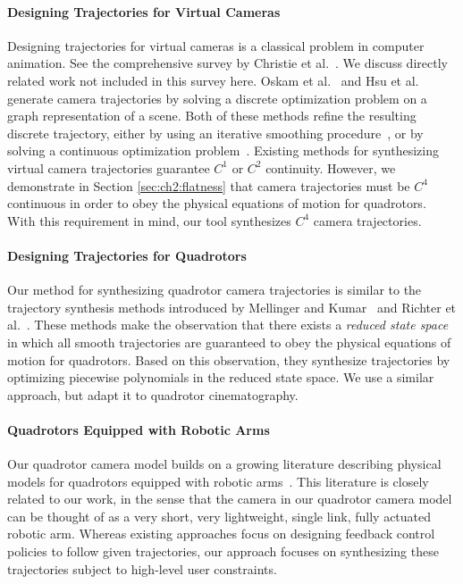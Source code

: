 \paragraph{Designing Trajectories for Virtual Cameras}
Designing trajectories for virtual cameras is a classical problem in computer animation.
See the comprehensive survey by Christie et al.~.
We discuss directly related work not included in this survey here.
Oskam et al.~ and Hsu et al.~ generate camera trajectories by solving a discrete optimization problem on a graph representation of a scene.
Both of these methods refine the resulting  discrete trajectory, either by using an iterative smoothing procedure~\cite{oskam:2009}, or by solving a continuous optimization problem~\cite{hsu:2013}.
Existing methods for synthesizing virtual camera trajectories guarantee $C^1$ or $C^2$ continuity.
However, we demonstrate in Section \ref{sec:ch2:flatness} that camera trajectories must be $C^4$ continuous in order to obey the physical equations of motion for quadrotors.
With this requirement in mind, our tool synthesizes $C^4$ camera trajectories.

\paragraph{Designing Trajectories for Quadrotors}
Our method for synthesizing quadrotor camera trajectories is similar to the trajectory synthesis methods introduced by Mellinger and Kumar~ and Richter et al.~.
These methods make the observation that there exists a \emph{reduced state space} in which all smooth trajectories are guaranteed to obey the physical equations of motion for quadrotors.
Based on this observation, they synthesize trajectories by optimizing piecewise polynomials in the reduced state space.
We use a similar approach, but adapt it to quadrotor cinematography.

\paragraph{Quadrotors Equipped with Robotic Arms}
Our quadrotor camera model builds on a growing literature describing physical models for quadrotors equipped with robotic arms~\cite{lipiello:2012,kim:2013,yang:2014,ruggiero:2015}.
This literature is closely related to our work, in the sense that the camera in our quadrotor camera model can be thought of as a very short, very lightweight, single link, fully actuated robotic arm.
Whereas existing approaches focus on designing feedback control policies to follow given trajectories, our approach focuses on synthesizing these trajectories subject to high-level user constraints.

